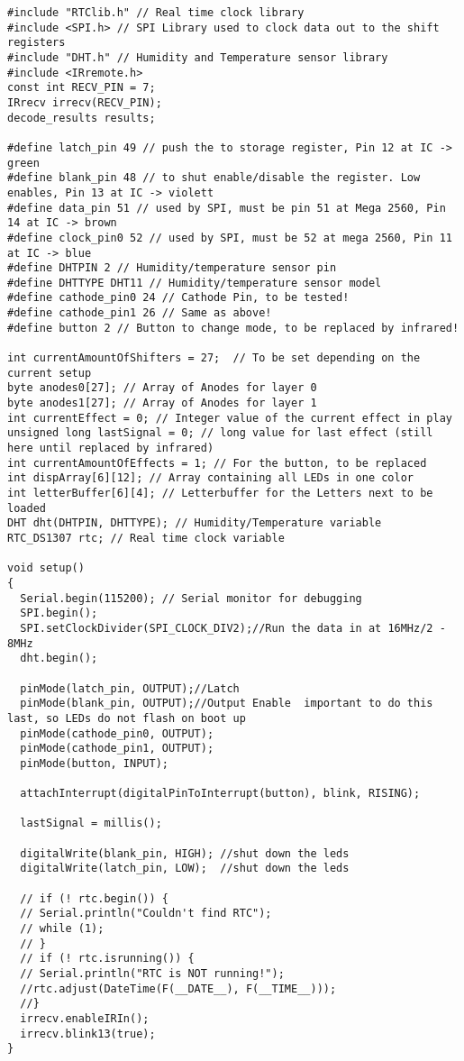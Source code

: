 \documentclass[12pt,a4paper]{article}
\begin{document}
\begin{lstlisting}[language=Arduino]  
#include "RTClib.h" // Real time clock library
#include <SPI.h> // SPI Library used to clock data out to the shift registers
#include "DHT.h" // Humidity and Temperature sensor library
#include <IRremote.h>
const int RECV_PIN = 7;
IRrecv irrecv(RECV_PIN);
decode_results results;

#define latch_pin 49 // push the to storage register, Pin 12 at IC -> green
#define blank_pin 48 // to shut enable/disable the register. Low enables, Pin 13 at IC -> violett
#define data_pin 51 // used by SPI, must be pin 51 at Mega 2560, Pin 14 at IC -> brown
#define clock_pin0 52 // used by SPI, must be 52 at mega 2560, Pin 11 at IC -> blue
#define DHTPIN 2 // Humidity/temperature sensor pin
#define DHTTYPE DHT11 // Humidity/temperature sensor model
#define cathode_pin0 24 // Cathode Pin, to be tested!
#define cathode_pin1 26 // Same as above!
#define button 2 // Button to change mode, to be replaced by infrared!

int currentAmountOfShifters = 27;  // To be set depending on the current setup
byte anodes0[27]; // Array of Anodes for layer 0
byte anodes1[27]; // Array of Anodes for layer 1
int currentEffect = 0; // Integer value of the current effect in play
unsigned long lastSignal = 0; // long value for last effect (still here until replaced by infrared)
int currentAmountOfEffects = 1; // For the button, to be replaced
int dispArray[6][12]; // Array containing all LEDs in one color
int letterBuffer[6][4]; // Letterbuffer for the Letters next to be loaded
DHT dht(DHTPIN, DHTTYPE); // Humidity/Temperature variable
RTC_DS1307 rtc; // Real time clock variable

void setup()
{
  Serial.begin(115200); // Serial monitor for debugging
  SPI.begin();
  SPI.setClockDivider(SPI_CLOCK_DIV2);//Run the data in at 16MHz/2 - 8MHz
  dht.begin();

  pinMode(latch_pin, OUTPUT);//Latch
  pinMode(blank_pin, OUTPUT);//Output Enable  important to do this last, so LEDs do not flash on boot up
  pinMode(cathode_pin0, OUTPUT);
  pinMode(cathode_pin1, OUTPUT);
  pinMode(button, INPUT);

  attachInterrupt(digitalPinToInterrupt(button), blink, RISING);

  lastSignal = millis();

  digitalWrite(blank_pin, HIGH); //shut down the leds
  digitalWrite(latch_pin, LOW);  //shut down the leds

  // if (! rtc.begin()) {
  // Serial.println("Couldn't find RTC");
  // while (1);
  // }
  // if (! rtc.isrunning()) {
  // Serial.println("RTC is NOT running!");
  //rtc.adjust(DateTime(F(__DATE__), F(__TIME__)));
  //}
  irrecv.enableIRIn();
  irrecv.blink13(true);
}


\end{lstlisting}
\end{document}
